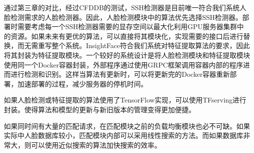 通过第三章的对比，经过CFDDB的测试，SSH检测器\cite{najibi2017ssh}是目前唯一符合我们系统人脸检测需求的人脸检测器。因此，人脸检测模块中的算法优先选择SSH检测器。部署时需要考虑每一个SSH检测器需要的显存空间以最大化利用GPU服务器集群中的资源。如果未来有更优的算法，可以直接将其模块化，实现需要的接口后进行替换，而无需重写整个系统。InsightFace\cite{deng2018arcface}符合我们系统对特征提取算法的要求，因此将其封装为特征提取模块。一个较好的系统设计是将人脸检测模块和特征提取模块使用同一个Docker容器封装，外部程序通过使用GRPC框架调用容器内部的程序进而进行检测和识别。这样当算法有更新时，可以将更新完的Docker容器重新部署，加速部署的过程，减少服务器的停机时间。

如果人脸检测或特征提取的算法使用了TensorFlow实现，可以使用TFserving进行封装。使得算法和模型的更新与新旧版本的管理变得更加便捷。

如果同时间有大量的匹配请求，在匹配模块之前的负载均衡模块也必不可缺。如果实际中人脸数据库较小，匹配模块内部可以采用线性搜索的方法。而如果数据库非常大，则可以使用近似搜索的算法加快搜索的效率。



